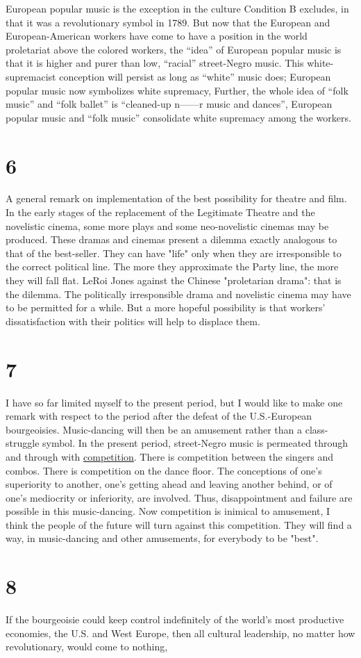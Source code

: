 European popular music is the exception in the culture Condition B excludes, in that it was a revolutionary symbol in 1789. But now that the European and European-American workers have come to have a position in the world proletariat above the colored workers, the \enquote{idea} of European popular music is that it is higher and purer than low, \enquote{racial} street-Negro music. This white-supremacist conception will persist as long as \enquote{white} music does; European popular music now symbolizes white supremacy, Further, the whole idea of \enquote{folk music} and \enquote{folk ballet} is \enquote{cleaned-up n------r music and dances}, European popular music and \enquote{folk music} consolidate white supremacy among the workers. 

\section*{6}
A general remark on implementation of the best possibility for theatre and film. In the early stages of the replacement of the Legitimate Theatre and the novelistic cinema, some more plays and some neo-novelistic cinemas may be produced. These dramas and cinemas present a dilemma exactly analogous to that of the best-seller. They can have "life" only when they are irresponsible to the correct political line. The more they approximate the Party line, the more they will fall flat. LeRoi Jones against the Chinese "proletarian drama": that is the dilemma. The politically irresponsible drama and novelistic cinema may have to be permitted for a while. But a more hopeful possibility is that workers' dissatisfaction with their politics will help to displace them. 

\section*{7}
I have so far limited myself to the present period, but I would like to make one remark with respect to the period after the defeat of the U.S.-European bourgeoisies. Music-dancing will then be an amusement rather than a class-struggle symbol. In the present period, street-Negro music is permeated through and through with \uline{competition}. There is competition between the singers and combos. There is competition on the dance floor. The conceptions of one's superiority to another, one's getting ahead and leaving another behind, or of one's mediocrity or inferiority, are involved. Thus, disappointment and failure are possible in this music-dancing. Now competition is inimical to amusement, I think the people of the future will turn against this competition. They will find a way, in music-dancing and other amusements, for everybody to be "best". 

\section*{8}
If the bourgeoisie could keep control indefinitely of the world's most productive economies, the U.S. and West Europe, then all cultural leadership, no matter how revolutionary, would come to nothing, 
